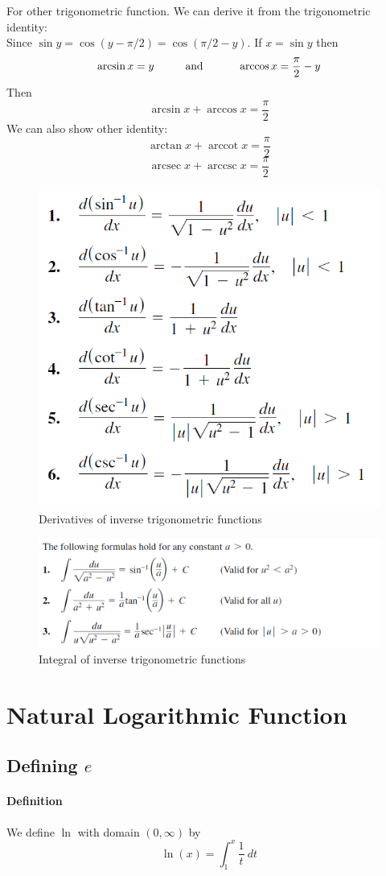 \documentclass[12pt]{article}
\DeclareMathOperator{\arcsec}{arcsec}
\DeclareMathOperator{\arccot}{arccot}
\DeclareMathOperator{\arccsc}{arccsc}
\newcommand\tab[1][1cm]{\hspace*{#1}}
\begin{document}
For other trigonometric function. We can derive it from the trigonometric identity: \\
Since $\sin y = \cos (y - \pi/2) = \cos (\pi/2 - y)$. If $x = \sin y$ then 
\[
    \arcsin x = y \textrm{\tab and \tab} \arccos x = \frac{\pi}{2} - y
\]
Then 
\[
    \arcsin x + \arccos x = \frac{\pi}{2}
\]
We can also show other identity:
\[
    \arctan x + \arccot  x = \frac{\pi}{2}
\]
\[
    \arcsec x + \arccsc  x = \frac{\pi}{2}
\]

\begin{figure}[H]
     \centering
     \includegraphics[width = 0.5 \linewidth]{Images/inverse trigonometric derivatives.png} 
     \caption{Derivatives of inverse trigonometric functions}
\end{figure}

\begin{figure}[H]
    \centering
    \includegraphics[width = 0.8 \linewidth]{Images/integral of inverse function.png} 
    \caption{Integral of inverse trigonometric functions}
\end{figure}
\section{Natural Logarithmic Function}
\subsection{Defining $e$}
\paragraph{Definition}
We define $\ln$ with domain $(0, \infty)$ by
\[
    \ln(x) = \int_1^x \frac{1}{t}\: dt
\]
\end{document}
